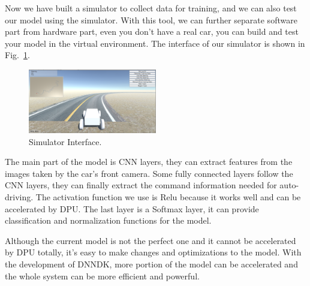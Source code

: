 \documentclass[conference]{IEEEtran}
\begin{document}
Now we have built a simulator to collect data for training, and we can also test our model using the simulator. With this tool, we can further separate software part from hardware part, even you don't have a real car, you can build and test your model in the virtual environment. The interface of our simulator is shown in Fig.~\ref{si}.  

\begin{figure}[htbp]
\centerline{\includegraphics[width=0.5\textwidth]{simulator.png}}
\caption{Simulator Interface.}
\label{si}
\end{figure}

The main part of the model is CNN layers, they can extract features from the images taken by the car's front camera. Some fully connected layers follow the CNN layers, they can finally extract the command information needed for auto-driving. The activation function we use is Relu because it works well and can be accelerated by DPU. The last layer is a Softmax layer, it can provide classification and normalization functions for the model.  

Although the current model is not the perfect one and it cannot be accelerated by DPU totally, it's easy to make changes and optimizations to the model. With the development of DNNDK, more portion of the model can be accelerated and the whole system can be more efficient and powerful.
\end{document}
